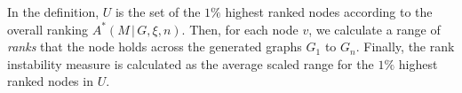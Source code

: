 In the definition, $U$ is the set of the $1\%$ highest ranked nodes according to the overall ranking $A^*\!\left(M \,|\, G, \xi, n \right)$.
Then, for each node $v$, we calculate a range of \textsl{ranks} that the node holds across the generated graphs $G_1$ to $G_n$.
Finally, the rank instability measure is calculated as the average scaled range for the $1\%$ highest ranked nodes in $U$.

\parspace



